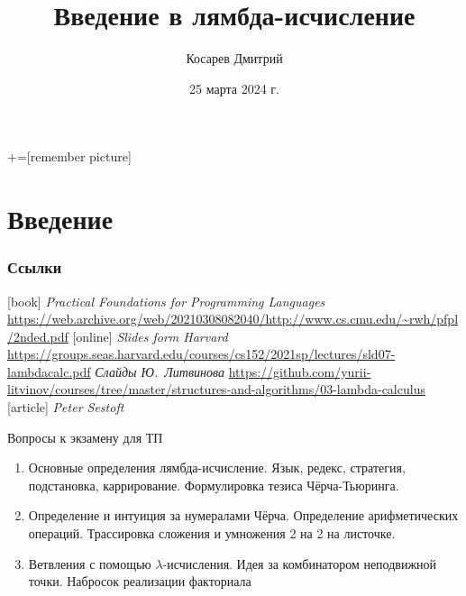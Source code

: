 \documentclass[aspectratio=169
  , xcolor={svgnames}
  , hyperref=
      { colorlinks
      , urlcolor=DarkBlue
      }
  , russian  %
  ]{beamer}
\title[Введение в лямбда-исчисление]{Введение в лямбда-исчисление}
\author{Косарев Дмитрий}
\date{25 марта 2024 г.}
\begin{document}
\maketitle

+=[remember picture]

\everymath{\displaystyle}





\section*{Введение}


\begin{frame}%
\frametitle<presentation>{Ссылки}
\begin{thebibliography}{10}
[book]
      {\em Practical Foundations for Programming Languages}
      \newblock\url{https://web.archive.org/web/20210308082040/http://www.cs.cmu.edu/~rwh/pfpl/2nded.pdf}
[online]
      {\em Slides form Harvard}
      \newblock\url{https://groups.seas.harvard.edu/courses/cs152/2021sp/lectures/sld07-lambdacalc.pdf}
      {\em Слайды Ю.~Литвинова} \newblock\url{https://github.com/yurii-litvinov/courses/tree/master/structures-and-algorithms/03-lambda-calculus}
[article]
      {\em Peter Sestoft}

\end{thebibliography}
\end{frame}

\begin{frame}{Вопросы к экзамену для ТП}
\begin{enumerate}
	\item Основные определения лямбда-исчисление. Язык, редекс, стратегия, подстановка, каррирование. Формулировка тезиса Чёрча-Тьюринга.
	\item Определение и интуиция за нумералами Чёрча. Определение арифметических операций. 
	Трассировка сложения и умножения 2 на 2 на листочке.
	\item Ветвления с помощью $\lambda$-исчисления. Идея за комбинатором неподвижной точки. Набросок реализации факториала
\end{enumerate}
\end{frame}
\end{document}
